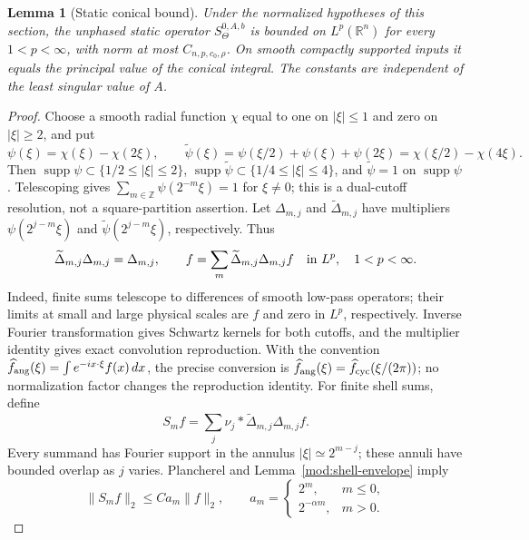 \documentclass[11pt]{article}
\numberwithin{equation}{section}
\newtheorem{lemma}[theorem]{Lemma}
\theoremstyle{remark}
\theoremstyle{definition}
\newcommand{\supp}{\operatorname{supp}}
\begin{document}
\begin{lemma}[Static conical bound]\label{mod:static-conical-radial}
Under the normalized hypotheses of this section, the unphased static
operator $S^{0,A,b}_\Theta$ is bounded on $L^p(\mathbb R^n)$ for every
$1<p<\infty$, with norm at most $C_{n,p,c_0,\rho}$. On smooth compactly
supported inputs it equals the principal value of the conical integral.
The constants are independent of the least singular value of $A$.
\end{lemma}
\begin{proof}

Choose a smooth radial function $\chi$ equal to one on $|\xi|\le1$
and zero on $|\xi|\ge2$, and put
\begin{equation}\label{eq:dual-cutoff-reproduction}
 \psi(\xi)=\chi(\xi)-\chi(2\xi),\qquad
 \widetilde\psi(\xi)=\psi(\xi/2)+\psi(\xi)+\psi(2\xi)
                  =\chi(\xi/2)-\chi(4\xi).
\end{equation}
Then $\supp\psi\subset\{1/2\le|\xi|\le2\}$,
$\supp\widetilde\psi\subset\{1/4\le|\xi|\le4\}$, and
$\widetilde\psi=1$ on $\supp\psi$. Telescoping gives
$\sum_{m\in\mathbb Z}\psi(2^{-m}\xi)=1$ for $\xi\ne0$;
this is a dual-cutoff resolution, not a square-partition assertion.
Let $\Delta_{m,j}$ and $\widetilde\Delta_{m,j}$ have multipliers
$\psi(2^{j-m}\xi)$ and $\widetilde\psi(2^{j-m}\xi)$, respectively. Thus
\[
 \widetilde\Delta_{m,j}\Delta_{m,j}=\Delta_{m,j},\qquad
 f=\sum_m\widetilde\Delta_{m,j}\Delta_{m,j}f
 \quad\hbox{in }L^p,\quad 1<p<\infty.
\]
Indeed, finite sums telescope to differences of smooth low-pass
operators; their limits at small and large physical scales are $f$ and
zero in $L^p$, respectively. Inverse Fourier transformation gives
Schwartz kernels for both cutoffs, and the multiplier identity gives
exact convolution reproduction. With the convention
$\widehat f_{\rm ang}(\xi)=\int e^{-ix\cdot\xi}f(x)\,dx$, the precise
conversion is $\widehat f_{\rm ang}(\xi)=\widehat f_{\rm cyc}(\xi/(2\pi))$;
no normalization factor changes the reproduction identity. For finite shell sums, define
\[
 S_m f=\sum_j\nu_j*\widetilde\Delta_{m,j}\Delta_{m,j}f.
\]
Every summand has Fourier support in the annulus
$|\xi|\simeq2^{m-j}$; these annuli have bounded overlap as $j$ varies.
Plancherel and Lemma~\ref{mod:shell-envelope} imply
\begin{equation}\label{radialmod:static-l2}
 \|S_mf\|_2\le C a_m\|f\|_2,
 \qquad
 a_m=\begin{cases}2^m,&m\le0,\\2^{-\alpha m},&m>0.\end{cases}

\end{equation}
\end{proof}
\end{document}
